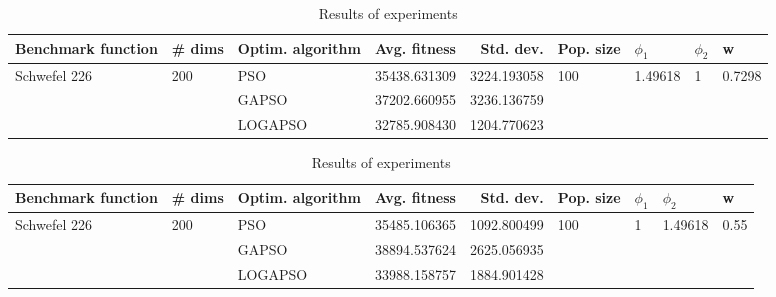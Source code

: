 \documentclass{article}
\begin{document}
\begin{table}
\centering
\caption{Results of experiments}
\begin{tabular}{lllrrllll}
\toprule
           Benchmark function &              \# dims & Optim. algorithm &  Avg. fitness &   Std. dev. &            Pop. size &               $\phi_{1}$ &         $\phi_{2}$ &                       w \\
\midrule
\multirow{3}{*}{Schwefel 226} & \multirow{3}{*}{200} &              PSO &  35438.631309 & 3224.193058 & \multirow{3}{*}{100} & \multirow{3}{*}{1.49618} & \multirow{3}{*}{1} & \multirow{3}{*}{0.7298} \\
                              &                      &            GAPSO &  37202.660955 & 3236.136759 &                      &                          &                    &                         \\
                              &                      &          LOGAPSO &  32785.908430 & 1204.770623 &                      &                          &                    &                         \\
\bottomrule
\end{tabular}
\end{table}
\begin{table}
\centering
\caption{Results of experiments}
\begin{tabular}{lllrrllll}
\toprule
           Benchmark function &              \# dims & Optim. algorithm &  Avg. fitness &   Std. dev. &            Pop. size &         $\phi_{1}$ &               $\phi_{2}$ &                     w \\
\midrule
\multirow{3}{*}{Schwefel 226} & \multirow{3}{*}{200} &              PSO &  35485.106365 & 1092.800499 & \multirow{3}{*}{100} & \multirow{3}{*}{1} & \multirow{3}{*}{1.49618} & \multirow{3}{*}{0.55} \\
                              &                      &            GAPSO &  38894.537624 & 2625.056935 &                      &                    &                          &                       \\
                              &                      &          LOGAPSO &  33988.158757 & 1884.901428 &                      &                    &                          &                       \\
\bottomrule
\end{tabular}
\end{table}
\end{document}
